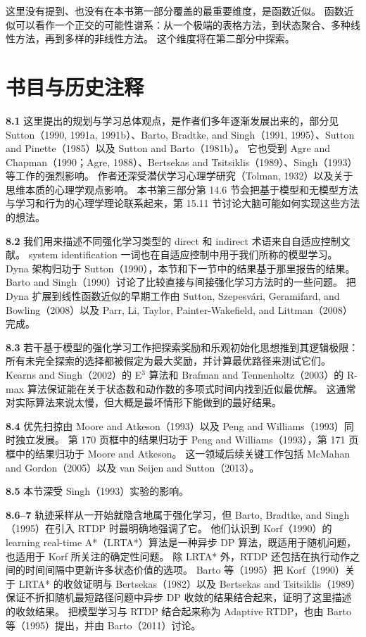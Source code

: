 \documentclass[UTF8, 12pt, fontset=fandol, oneside]{ctexart}
\begin{document}
这里没有提到、也没有在本书第一部分覆盖的最重要维度，是函数近似。
函数近似可以看作一个正交的可能性谱系：从一个极端的表格方法，到状态聚合、多种线性方法，再到多样的非线性方法。
这个维度将在第二部分中探索。

\section*{书目与历史注释}

\noindent\textbf{8.1}
这里提出的规划与学习总体观点，是作者们多年逐渐发展出来的，部分见 Sutton（1990, 1991a, 1991b）、Barto, Bradtke, and Singh（1991, 1995）、Sutton and Pinette（1985）以及 Sutton and Barto（1981b）。
它也受到 Agre and Chapman（1990；Agre, 1988）、Bertsekas and Tsitsiklis（1989）、Singh（1993）等工作的强烈影响。
作者还深受潜伏学习心理学研究（Tolman, 1932）以及关于思维本质的心理学观点影响。
本书第三部分第 14.6 节会把基于模型和无模型方法与学习和行为的心理学理论联系起来，第 15.11 节讨论大脑可能如何实现这些方法的想法。

\noindent\textbf{8.2}
我们用来描述不同强化学习类型的 direct 和 indirect 术语来自自适应控制文献。
system identification 一词也在自适应控制中用于我们所称的模型学习。
Dyna 架构归功于 Sutton（1990），本节和下一节中的结果基于那里报告的结果。
Barto and Singh（1990）讨论了比较直接与间接强化学习方法时的一些问题。
把 Dyna 扩展到线性函数近似的早期工作由 Sutton, Szepesvári, Geramifard, and Bowling（2008）以及 Parr, Li, Taylor, Painter-Wakefield, and Littman（2008）完成。

\noindent\textbf{8.3}
若干基于模型的强化学习工作把探索奖励和乐观初始化思想推到其逻辑极限：所有未完全探索的选择都被假定为最大奖励，并计算最优路径来测试它们。
Kearns and Singh（2002）的 E$^3$ 算法和 Brafman and Tennenholtz（2003）的 R-max 算法保证能在关于状态数和动作数的多项式时间内找到近似最优解。
这通常对实际算法来说太慢，但大概是最坏情形下能做到的最好结果。

\noindent\textbf{8.4}
优先扫掠由 Moore and Atkeson（1993）以及 Peng and Williams（1993）同时独立发展。
第 170 页框中的结果归功于 Peng and Williams（1993），第 171 页框中的结果归功于 Moore and Atkeson。
这一领域后续关键工作包括 McMahan and Gordon（2005）以及 van Seijen and Sutton（2013）。

\noindent\textbf{8.5}
本节深受 Singh（1993）实验的影响。

\noindent\textbf{8.6--7}
轨迹采样从一开始就隐含地属于强化学习，但 Barto, Bradtke, and Singh（1995）在引入 RTDP 时最明确地强调了它。
他们认识到 Korf（1990）的 learning real-time A*（LRTA*）算法是一种异步 DP 算法，既适用于随机问题，也适用于 Korf 所关注的确定性问题。
除 LRTA* 外，RTDP 还包括在执行动作之间的时间间隔中更新许多状态价值的选项。
Barto 等（1995）把 Korf（1990）关于 LRTA* 的收敛证明与 Bertsekas（1982）以及 Bertsekas and Tsitsiklis（1989）保证不折扣随机最短路径问题中异步 DP 收敛的结果结合起来，证明了这里描述的收敛结果。
把模型学习与 RTDP 结合起来称为 Adaptive RTDP，也由 Barto 等（1995）提出，并由 Barto（2011）讨论。
\end{document}
